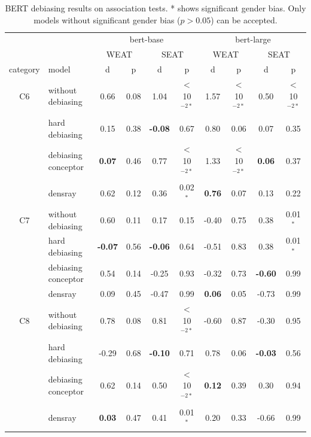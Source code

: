 \begin{table}[h]
	\centering
	\footnotesize
	\vspace{0cm}  
	\setlength{\abovecaptionskip}{0.2cm}   
	\setlength{\belowcaptionskip}{0cm}
	\begin{tabular}{cl{|}cccc{|}cccc}
		\hline
		&&\multicolumn{4}{c|}{bert-base}&\multicolumn{4}{c}{bert-large}\\
		&&\multicolumn{2}{c}{WEAT}&\multicolumn{2}{c|}{SEAT}&\multicolumn{2}{c}{WEAT}&\multicolumn{2}{c}{SEAT}\\
		\hline
		category & model & d & p& d & p& d & p& d & p\\
		\hline
		C6 & without debiasing & 0.66 & 0.08 &1.04&$<$10$^{-2*}$& 1.57 & $<$10$^{-2*}$ &0.50&$<$10$^{-2*}$\\
		& hard debiasing& 0.15 & 0.38&\textbf{-0.08}&0.67& 0.80 & 0.06&0.07&0.35\\
		& debiasing conceptor & \textbf{0.07} & 0.46&0.77&$<$10$^{-2*}$ & 1.33 & $<$10$^{-2*}$&\textbf{0.06}&0.37\\
		&densray & 0.62 & 0.12&0.36&0.02$^{*}$ & \textbf{0.76} & 0.07&0.13&0.22\\
		\hline
		C7 & without debiasing & 0.60 & 0.11 &0.17&0.15 & -0.40 & 0.75 &0.38&0.01$^{*}$\\
		& hard debiasing & \textbf{-0.07} & 0.56&\textbf{-0.06}&0.64 & -0.51 & 0.83&0.38&0.01$^{*}$\\
		& debiasing conceptor & 0.54 & 0.14&-0.25&0.93 & -0.32 & 0.73&\textbf{-0.60}&0.99\\
		& densray & 0.09 & 0.45&-0.47&0.99 & \textbf{0.06} & 0.05&-0.73&0.99\\
		\hline
		C8& without debiasing & 0.78 & 0.08 &0.81&$<$10$^{-2*}$ & -0.60 & 0.87 &-0.30&0.95\\
		& hard debiasing & -0.29 & 0.68&\textbf{-0.10}&0.71 & 0.78 & 0.06&\textbf{-0.03}&0.56\\
		& debiasing conceptor & 0.62 & 0.14&0.50&$<$10$^{-2*}$& \textbf{0.12} & 0.39&0.30&0.94\\
		& densray & \textbf{0.03} & 0.47&0.41&0.01$^{*}$ & 0.20 & 0.33&-0.66&0.99\\
		\hline
	\end{tabular}
	\caption{
		BERT debiasing results on association tests. * shows significant gender bias. Only models without significant gender bias ($p>0.05$) can be accepted.}
\end{table}

